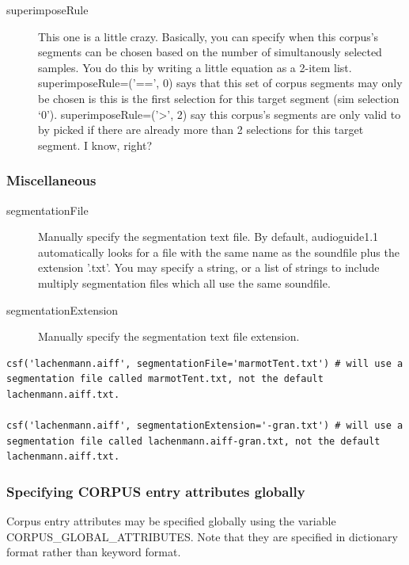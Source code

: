 \documentclass{article}
\newcommand{\ag}{audioguide1.1 }
\begin{document}
\begin{spacing}{1.2}
\begin{description}

\item[superimposeRule]  This one is a little crazy.  Basically, you can specify when this corpus's segments can be chosen based on the number of simultanously selected samples.  You do this by writing a little equation as a 2-item list.  superimposeRule=('==', 0) says that this set of corpus segments may only be chosen is this is the first selection for this target segment (sim selection `0').  superimposeRule=('>', 2) say this corpus's segments are only valid to by picked if there are already more than 2 selections for this target segment.  I know, right?
\end{description}


\subsubsection{Miscellaneous}
\begin{description}
\item[segmentationFile] Manually specify the segmentation text file. By default, \ag automatically looks for a file with the same name as the soundfile plus the extension '.txt'. You may specify a string, or a list of strings to include multiply segmentation files which all use the same soundfile.

\item[segmentationExtension] Manually specify the segmentation text file extension.
\end{description}

\begin{lstlisting}
csf('lachenmann.aiff', segmentationFile='marmotTent.txt') # will use a segmentation file called marmotTent.txt, not the default lachenmann.aiff.txt.

csf('lachenmann.aiff', segmentationExtension='-gran.txt') # will use a segmentation file called lachenmann.aiff-gran.txt, not the default lachenmann.aiff.txt.
\end{lstlisting}


\subsubsection{Specifying CORPUS entry attributes globally}
Corpus entry attributes may be specified globally using the variable CORPUS\_GLOBAL\_ATTRIBUTES.  Note that they are specified in dictionary format rather than keyword format.


\end{spacing}
\end{document}
